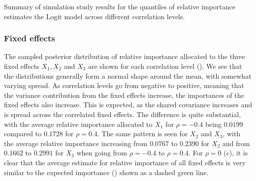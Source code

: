 \begin{table}[H]
  \caption{Summary of simulation study results for the quantiles of relative importance estimates the Logit model across different correlation levels.}
  \label{table:summary_logit}
\end{table}
\subsubsection{Fixed effects}
The sampled posterior distribution of relative importance allocated to the three fixed effects $X_1, X_2$ and $X_3$ are shown for each correlation level (). We see that the distributions generally form a normal shape around the mean, with somewhat varying spread. As correlation levels go from negative to positive, meaning that the variance contribution from the fixed effects increase, the importances of the fixed effects also increase. This is expected, as the shared covariance increases and is spread across the correlated fixed effects. The difference is quite substantial, with the average relative importance allocated to $X_1$ for $\rho=-0.4$ being $0.0199$ compared to $0.1728$ for $\rho=0.4$. The same pattern is seen for $X_2$ and $X_3$, with the average relative importance increasing from $0.0767$ to $0.2390$ for $X_2$ and from $0.1662$ to $0.2991$ for $X_3$ when going from $\rho=-0.4$ to $\rho=0.4$. For $\rho=0$ (c), it is clear that the average estimate for relative importance of all fixed effects is very similar to the expected importance () shown as a dashed green line. 
\\
\\
